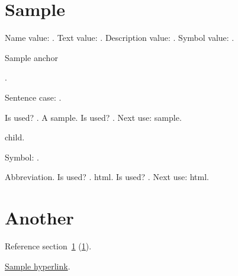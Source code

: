 \documentclass{article}
\begin{document}
\tableofcontents

\section{Sample}
\label{sec:sample}
Name value: .
Text value: .
Description value: .
Symbol value: .

\hypertarget{sampleanchor}{Sample anchor}.

Sentence case: .

Is used? .
A \gls{sample}.
Is used? .
Next use: \gls{sample}.

\Gls{child}.

Symbol: .

Abbreviation. 
Is used? .
\gls{html}.
Is used? .
Next use: \gls{html}.

\section{Another}
\label{sec:another}

Reference section~\ref{sec:sample} (\ref*{sec:sample}).

\hyperlink{sampleanchor}{Sample hyperlink}.

\printglossaries
\end{document}
